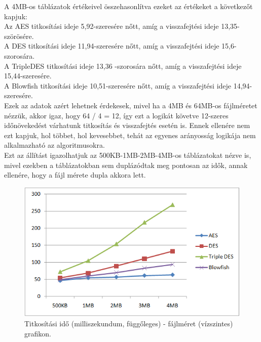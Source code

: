 A 4MB-os táblázatok értékeivel összehasonlítva ezeket az értékeket a következőt kapjuk:
\vspace{5pt}\\Az AES titkosítási ideje 5,92-szeresére nőtt, amíg a visszafejtési ideje 13,35-szörösére.
\vspace{5pt}\\A DES titkosítási ideje 11,94-szeresére nőtt, amíg a visszafejtési ideje 15,6-szorosára.
\vspace{5pt}\\A TripleDES titkosítási ideje 13,36 -szorosára nőtt, amíg a visszafejtési ideje 15,44-szeresére.
\vspace{5pt}\\A Blowfish titkosítási ideje 10,51-szeresére nőtt, amíg a visszafejtési ideje 14,94- szeresére.
\vspace{5pt}\\Ezek az adatok azért lehetnek érdekesek, mivel ha a 4MB és 64MB-os fájlméretet nézzük, akkor igaz, hogy 64 / 4 = 12, így ezt a logikát követve 12-szeres időnövekedést várhatunk titkosítás és visszafejtés esetén is. Ennek ellenére nem ezt kapjuk, hol többet, hol kevesebbet, tehát az egyenes arányosság logikája nem alkalmazható az algoritmusokra.
\vspace{5pt}\\Ezt az állítást igazolhatjuk az 500KB-1MB-2MB-4MB-os táblázatokat nézve is, mivel ezekben a táblázatokban sem duplázódtak meg pontosan az idők, annak ellenére, hogy a fájl mérete dupla akkora lett.


\begin{figure}[h]
	\centering
	\includegraphics[scale=0.8]{images/alg_graf_1.png}
	\caption{Titkosítási idő (milliszekundum, függőleges) - fájlméret (vízszintes) grafikon.}
	\label{fig:alg_titkositas_graf}
\end{figure}

